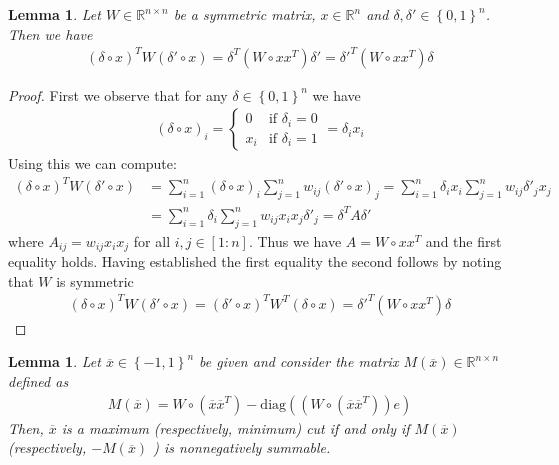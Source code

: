 \documentclass[12pt,a4paper]{article}
\theoremstyle{mythm}
\newtheorem{lem}[thm]{Lemma}
\begin{document}
\begin{lem}
\label{lem:calcrule} 
Let $ W \in \mathbb{R} ^{ n \times n }  $ be a symmetric matrix, $ x \in \mathbb{R} ^{ n } $ and $ \delta,  \delta ' \in \left\{ 0,1 \right\} ^{ n }  $.
Then we have
\begin{align*}
\left( \delta \circ x \right) ^T W \left(  \delta '  \circ x \right) = \delta ^T \left( W \circ x x ^T  \right)  \delta ' =  \delta '^T \left( W \circ x x ^T  \right) \delta
\end{align*} 
\end{lem} 
\begin{proof}
First we observe that for any $ \delta \in \left\{ 0,1 \right\} ^{ n }  $ we have
\begin{align*}
\left( \delta \circ x \right) _{ i } = \begin{cases}
0 & \text{if } \delta_i = 0\\
x_i & \text{if } \delta_i = 1
\end{cases}
= \delta_i x_i
\end{align*} 
Using this we can compute:
\begin{align*}
\left( \delta \circ x \right) ^T W \left( \delta ' \circ x \right) 
&= \sum_{ i = 1 }^{ n } \left( \delta \circ x \right) _{ i } \sum_{ j = 1 }^{ n } w _{ ij } \left( \delta ' \circ x \right) _{ j } 
= \sum_{ i = 1 }^{ n } \delta _{ i } x_i \sum_{ j = 1 }^{ n } w _{ ij } \delta ' _{ j } x_j \\
&= \sum_{ i = 1 }^{ n } \delta_i \sum_{ j = 1 }^{ n } w _{ ij } x_i x_j \delta'_j = \delta ^T A \delta '
\end{align*} 
where $ A _{ ij } = w _{ ij } x_i x_j $ for all $ i,j \in \left[ 1:n \right]  $.
Thus we have $ A = W \circ xx ^T  $ and the first equality holds.
Having established the first equality the second follows by noting that $ W $ is symmetric
\begin{align*}
\left( \delta \circ x \right) ^T W  \left( \delta ' \circ x \right)  
= \left( \delta' \circ x \right) ^T W ^T \left( \delta \circ x \right) 
= \delta'^T \left( W \circ xx^T \right)  \delta
\end{align*} 
\end{proof}
\begin{lem}
\label{lem:M(x)nonnegsum} 
Let $ \overline{ x } \in \left\{ -1,1 \right\} ^{ n }  $ be given and consider the matrix $ M( \overline{ x } ) \in \mathbb{R} ^{ n \times n }  $ defined as 
\begin{align}
\label{def:M(x)} 
M ( \overline{ x }  ) = W \circ \left( \overline{  x} \overline{ x } ^{ T }  \right) - \text{diag} \left( \left( W \circ \left( \overline{ x } \overline{ x } ^T  \right)
\right) e  \right) 
\end{align} 
Then, $ \overline{ x }  $ is a maximum (respectively, minimum) cut if and only if $ M ( \overline{ x }  )  $ (respectively, $ -M ( \overline{ x }  )  $ )
is nonnegatively summable.
\end{lem} 
\end{document}
